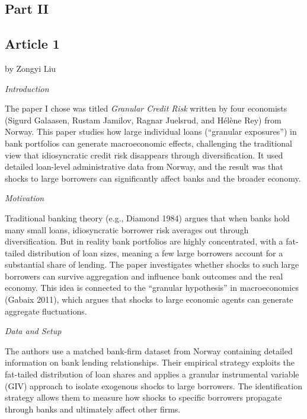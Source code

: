 \documentclass[letterpaper]{article}
\begin{document}
	\subsection{Part II}
	
	\subsection{Article 1}
	
	{\color{deepred} by Zongyi Liu}
	
	
	\textit{Introduction}
	
	The paper I chose was titled \textit{Granular Credit Risk} written by four economists (Sigurd Galaasen, Rustam Jamilov, Ragnar Juelsrud, and H\'{e}l\`{e}ne Rey) from Norway. This paper studies how large individual loans (``granular exposures'') in bank portfolios can generate macroeconomic effects, challenging the traditional view that idiosyncratic credit risk disappears through diversification. It used detailed loan-level administrative data from Norway, and the result was that shocks to large borrowers can significantly affect banks and the broader economy.
	
	\medskip
	
	\textit{Motivation}
	
	Traditional banking theory (e.g., Diamond 1984) argues that when banks hold many small loans, idiosyncratic borrower risk averages out through diversification. But in reality bank portfolios are highly concentrated, with a fat-tailed distribution of loan sizes, meaning a few large borrowers account for a substantial share of lending. The paper investigates whether shocks to such large borrowers can survive aggregation and influence bank outcomes and the real economy. This idea is connected to the ``granular hypothesis'' in macroeconomics (Gabaix 2011), which argues that shocks to large economic agents can generate aggregate fluctuations.
	
	\medskip
	
	\textit{Data and Setup}
	
	The authors use a matched bank-firm dataset from Norway containing detailed information on bank lending relationships. Their empirical strategy exploits the fat-tailed distribution of loan shares and applies a granular instrumental variable (GIV) approach to isolate exogenous shocks to large borrowers. The identification strategy allows them to measure how shocks to specific borrowers propagate through banks and ultimately affect other firms.
	
\end{document}
